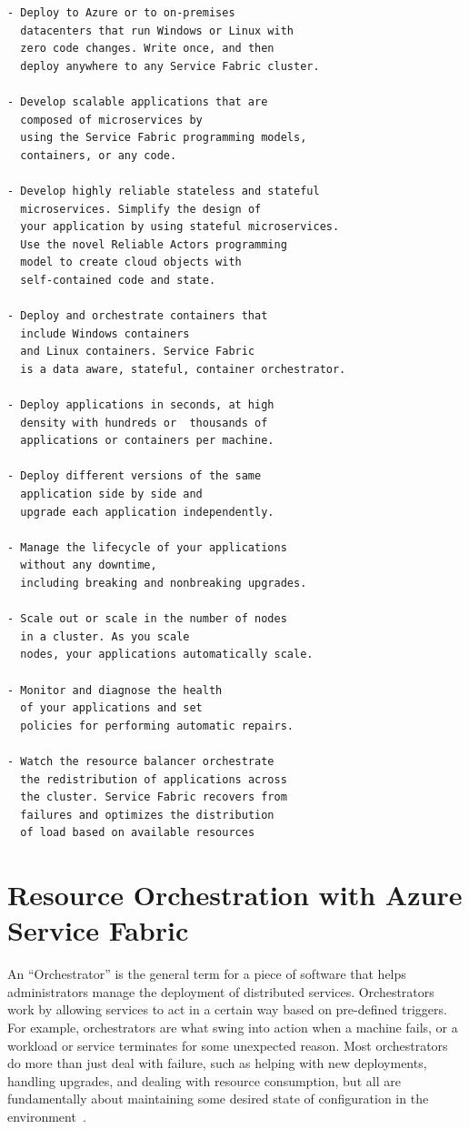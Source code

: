 \begin{verbatim}
- Deploy to Azure or to on-premises 
  datacenters that run Windows or Linux with 
  zero code changes. Write once, and then 
  deploy anywhere to any Service Fabric cluster.

- Develop scalable applications that are 
  composed of microservices by
  using the Service Fabric programming models, 
  containers, or any code.

- Develop highly reliable stateless and stateful
  microservices. Simplify the design of 
  your application by using stateful microservices.
  Use the novel Reliable Actors programming
  model to create cloud objects with 
  self-contained code and state.

- Deploy and orchestrate containers that 
  include Windows containers
  and Linux containers. Service Fabric 
  is a data aware, stateful, container orchestrator.

- Deploy applications in seconds, at high 
  density with hundreds or  thousands of 
  applications or containers per machine.

- Deploy different versions of the same 
  application side by side and
  upgrade each application independently.

- Manage the lifecycle of your applications 
  without any downtime,
  including breaking and nonbreaking upgrades.

- Scale out or scale in the number of nodes 
  in a cluster. As you scale
  nodes, your applications automatically scale.

- Monitor and diagnose the health 
  of your applications and set
  policies for performing automatic repairs.

- Watch the resource balancer orchestrate 
  the redistribution of applications across 
  the cluster. Service Fabric recovers from
  failures and optimizes the distribution 
  of load based on available resources

\end{verbatim}


\section{Resource Orchestration with Azure Service Fabric}
An “Orchestrator” is the general term for a piece of software that
helps administrators manage the deployment of distributed
services. Orchestrators work by allowing services to act in a certain
way based on pre-defined triggers. For example, orchestrators are what
swing into action when a machine fails, or a workload or service
terminates for some unexpected reason. Most orchestrators do more than
just deal with failure, such as helping with new deployments, handling
upgrades, and dealing with resource consumption, but all are
fundamentally about maintaining some desired state of configuration in
the environment~\cite{hid-sp18-501-cluster}.
 
